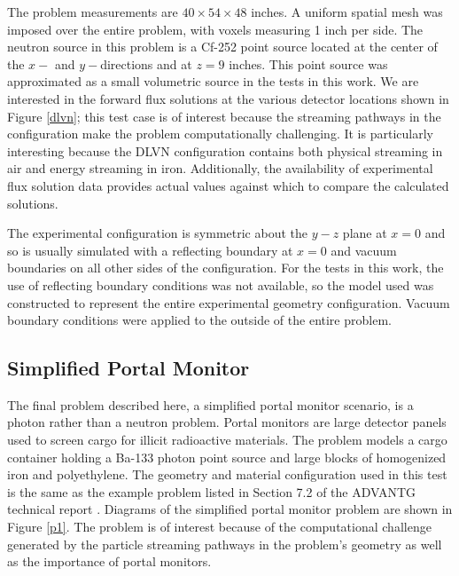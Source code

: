 \documentclass{article} %
\begin{document}
The problem measurements are $40\times54\times48$ inches. A uniform spatial
mesh was imposed over the entire problem, with voxels measuring 1 inch per
side. The neutron source in this problem is a Cf-252 point source located at
the center of the $x-$ and $y-$directions and at $z = 9$ inches. This point
source was approximated as a small volumetric source in the tests in this
work. We are interested in the forward flux solutions at the various detector
locations shown in Figure \ref{dlvn}; this test case is of interest
because the streaming pathways in the configuration make the problem
computationally challenging. It is particularly interesting because the DLVN
configuration contains both physical streaming in air and energy streaming in
iron. Additionally, the availability of experimental flux solution data
provides actual values against which to compare the calculated solutions.

The experimental configuration is symmetric about the $y-z$ plane at $x = 0$
and so is usually simulated with a reflecting boundary at $x = 0$ and vacuum
boundaries on all other sides of the configuration. For the tests in this work,
the use of reflecting boundary conditions was not available, so the model used 
was constructed to represent the entire experimental geometry configuration.
Vacuum boundary conditions were applied to the outside of the entire problem.

\subsection{Simplified Portal Monitor}

The final problem described here, a simplified portal monitor scenario, is a
photon rather than a neutron problem. Portal monitors are large detector
panels used to screen cargo for illicit radioactive materials. The problem
models a cargo container holding a Ba-133 photon point source and large blocks
of homogenized iron and polyethylene. The geometry and material configuration
used in this test is the same as the example problem listed in Section 7.2 of
the ADVANTG technical report \cite{advantg}. Diagrams of the simplified portal
monitor problem are shown in Figure \ref{p1}. The problem is of interest
because of the computational challenge generated by the particle streaming
pathways in the problem's geometry as well as the importance of portal
monitors.
\end{document}

